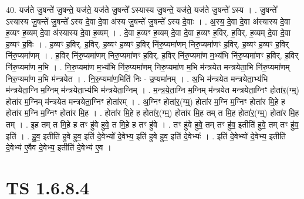 \documentclass[17pt]{extarticle}
\begin{document}
40. यज॑ते जु॒षन्ते॑ जु॒षन्ते॒ यज॑ते॒ यज॑ते जु॒षन्ते᳚ ऽस्यास्य जु॒षन्ते॒ यज॑ते॒ यज॑ते जु॒षन्ते᳚ ऽस्य । . जु॒षन्ते᳚ ऽस्यास्य जु॒षन्ते॑ जु॒षन्ते᳚ ऽस्य दे॒वा दे॒वा अ॑स्य जु॒षन्ते॑ जु॒षन्ते᳚ ऽस्य दे॒वाः । . अ॒स्य॒ दे॒वा दे॒वा अ॑स्यास्य दे॒वा ह॒व्यꣳ ह॒व्यम् दे॒वा अ॑स्यास्य दे॒वा ह॒व्यम् । . दे॒वा ह॒व्यꣳ ह॒व्यम् दे॒वा दे॒वा ह॒व्यꣳ ह॒विर्. ह॒विर्. ह॒व्यम् दे॒वा दे॒वा ह॒व्यꣳ ह॒विः । . ह॒व्यꣳ ह॒विर्. ह॒विर्. ह॒व्यꣳ ह॒व्यꣳ ह॒विर् नि॑रु॒प्यमा॑णम् निरु॒प्यमा॑णꣳ ह॒विर्. ह॒व्यꣳ ह॒व्यꣳ ह॒विर् नि॑रु॒प्यमा॑णम् । . ह॒विर् नि॑रु॒प्यमा॑णम् निरु॒प्यमा॑णꣳ ह॒विर्. ह॒विर् नि॑रु॒प्यमा॑ण म॒भ्य॑भि नि॑रु॒प्यमा॑णꣳ ह॒विर्. ह॒विर् नि॑रु॒प्यमा॑ण म॒भि । . नि॒रु॒प्यमा॑ण म॒भ्य॑भि नि॑रु॒प्यमा॑णम् निरु॒प्यमा॑ण म॒भि म॑न्त्रयेत मन्त्रयेता॒भि नि॑रु॒प्यमा॑णम् निरु॒प्यमा॑ण म॒भि म॑न्त्रयेत । . नि॒रु॒प्यमा॑ण॒मिति॑ निः - उ॒प्यमा॑नम् । . अ॒भि म॑न्त्रयेत मन्त्रयेता॒भ्य॑भि म॑न्त्रयेता॒ग्नि म॒ग्निम् म॑न्त्रयेता॒भ्य॑भि म॑न्त्रयेता॒ग्निम् । . म॒न्त्र॒ये॒ता॒ग्नि म॒ग्निम् म॑न्त्रयेत मन्त्रयेता॒ग्निꣳ होता॑र॒(ग्म्॒) होता॑र म॒ग्निम् म॑न्त्रयेत मन्त्रयेता॒ग्निꣳ होता॑रम् । . अ॒ग्निꣳ होता॑र॒(ग्म्॒) होता॑र म॒ग्नि म॒ग्निꣳ होता॑र मि॒हे ह होता॑र म॒ग्नि म॒ग्निꣳ होता॑र मि॒ह । . होता॑र मि॒हे ह होता॑र॒(ग्म्॒) होता॑र मि॒ह तम् त मि॒ह होता॑र॒(ग्म्॒) होता॑र मि॒ह तम् । . इ॒ह तम् त मि॒हे ह तꣳ हु॑वे हुवे॒ त मि॒हे ह तꣳ हु॑वे । . तꣳ हु॑वे हुवे॒ तम् तꣳ हु॑व॒ इतीति॑ हुवे॒ तम् तꣳ हु॑व॒ इति॑ । . हु॒व॒ इतीति॑ हुवे हुव॒ इति॑ दे॒वेभ्यो॑ दे॒वेभ्य॒ इति॑ हुवे हुव॒ इति॑ दे॒वेभ्यः॑ । . इति॑ दे॒वेभ्यो॑ दे॒वेभ्य॒ इतीति॑ दे॒वेभ्य॑ ए॒वैव दे॒वेभ्य॒ इतीति॑ दे॒वेभ्य॑ ए॒व । \newline
\pagebreak
{}
\section*{ TS 1.6.8.4 }
\end{document}
